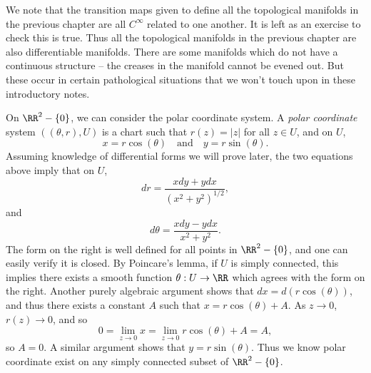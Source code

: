 We note that the transition maps given to define all the topological manifolds in the previous chapter are all $C^\infty$ related to one another. It is left as an exercise to check this is true. Thus all the topological manifolds in the previous chapter are also differentiable manifolds. There are some manifolds which do not have a continuous structure -- the creases in the manifold cannot be evened out. But these occur in certain pathological situations that we won't touch upon in these introductory notes.

\begin{example}
    On $\RR^2 - \{ 0 \}$, we can consider the polar coordinate system. A \emph{polar coordinate} system $((\theta, r),U)$ is a chart such that $r(z) = |z|$ for all $z \in U$, and on $U$,
    \[ x = r \cos(\theta) \quad\text{and}\quad y = r \sin(\theta). \]
    Assuming knowledge of differential forms we will prove later, the two equations above imply that on $U$,
    \[ dr = \frac{xdy + ydx}{(x^2 + y^2)^{1/2}}, \]
    and
    \[ d\theta = \frac{x dy - y dx}{x^2 + y^2}. \]
    The form on the right is well defined for all points in $\RR^2 - \{ 0 \}$, and one can easily verify it is closed. By Poincare's lemma, if $U$ is simply connected, this implies there exists a smooth function $\theta: U \to \RR$ which agrees with the form on the right. Another purely algebraic argument shows that $dx = d(r \cos(\theta))$, and thus there exists a constant $A$ such that $x = r \cos(\theta) + A$. As $z \to 0$, $r(z) \to 0$, and so
    \[ 0 = \lim_{z \to 0} x = \lim_{z \to 0} r \cos(\theta) + A = A, \]
    so $A = 0$. A similar argument shows that $y = r \sin(\theta)$. Thus we know polar coordinate exist on any simply connected subset of $\RR^2 - \{ 0 \}$.
\end{example}

